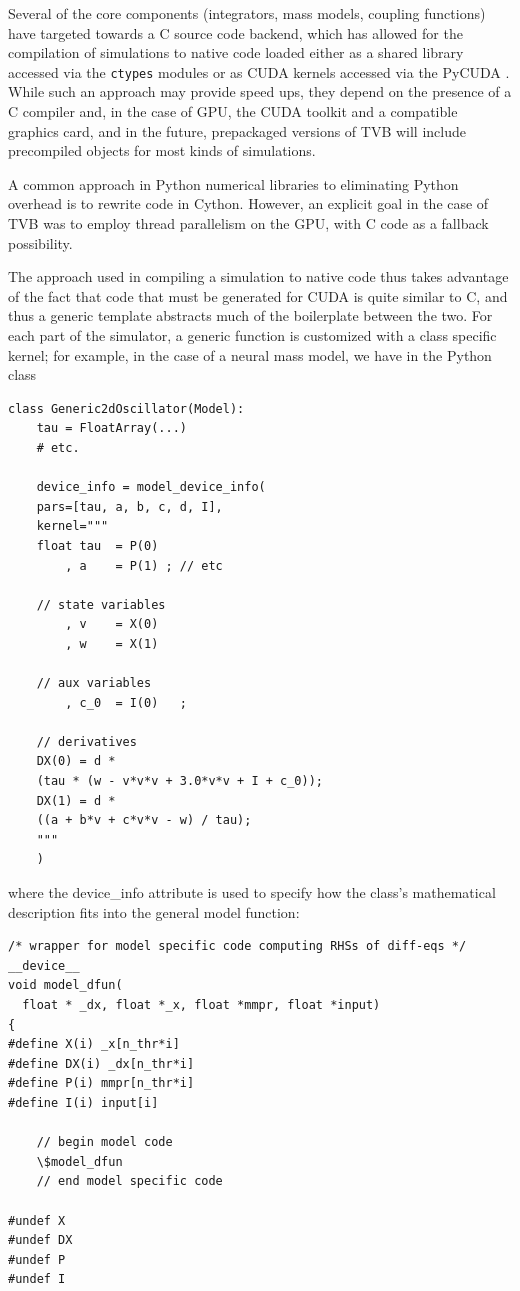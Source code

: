 Several of the core components (integrators, mass models, coupling
functions) have targeted towards a C source code backend, which has
allowed for the compilation of simulations to native code loaded 
either as a shared library accessed via the \texttt{ctypes} modules
or as CUDA kernels accessed via the PyCUDA \cite{PyCUDA}. 
While such an approach may provide speed ups, they depend on the
presence of a C compiler and, in the case of GPU, the CUDA toolkit and
a compatible graphics card, and in the future, prepackaged versions of TVB
will include precompiled objects for most kinds of simulations. 

A common approach in Python numerical libraries to eliminating Python
overhead is to rewrite code in Cython. However, an explicit goal in 
the case of TVB was
to employ thread parallelism on the GPU, with C code as a fallback 
possibility. 

The approach used in compiling a simulation to native code thus takes advantage
of the fact that code that must be generated for CUDA is quite similar to C,
and thus a generic template abstracts much of the boilerplate between the two.
For each part of the simulator, a generic function is customized with a class
specific kernel; for example, in the case of a neural mass model, we have in
the Python class

\begin{lstlisting}[caption={The Generic2dOscillator listing},
	       label={lst:g2dOscil}]
class Generic2dOscillator(Model):
    tau = FloatArray(...)
    # etc.

    device_info = model_device_info(
	pars=[tau, a, b, c, d, I],
	kernel="""
	float tau  = P(0)
	    , a    = P(1) ; // etc

	// state variables
	    , v    = X(0)
	    , w    = X(1)

	// aux variables
	    , c_0  = I(0)   ;

	// derivatives
	DX(0) = d * 
	(tau * (w - v*v*v + 3.0*v*v + I + c_0));
	DX(1) = d * 
	((a + b*v + c*v*v - w) / tau);
	"""
    )
\end{lstlisting}

\noindent where the device\_info attribute is used to specify how the
class's mathematical description fits into the general model function:

\begin{lstlisting}[caption={The Listing},label={lst:wrapper}]
/* wrapper for model specific code computing RHSs of diff-eqs */
__device__
void model_dfun(
  float * _dx, float *_x, float *mmpr, float *input)
{
#define X(i) _x[n_thr*i]
#define DX(i) _dx[n_thr*i]
#define P(i) mmpr[n_thr*i]
#define I(i) input[i]

    // begin model code
    \$model_dfun
    // end model specific code

#undef X
#undef DX
#undef P
#undef I
\end{lstlisting}

